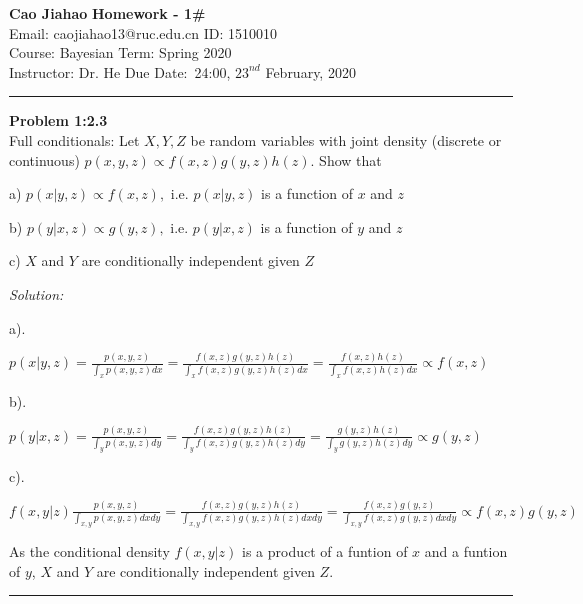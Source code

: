 \documentclass[a4paper, 11pt]{article}
\newenvironment{problem}[2][Problem]
    { \begin{mdframed}[backgroundcolor=gray!20] \textbf{#1 #2} \\}
    {  \end{mdframed}}
\newenvironment{solution}
    {\textit{Solution:}}
    {}
\begin{document}
\noindent
\large\textbf{Cao Jiahao} \hfill \textbf{Homework - 1\#}   \\
Email: caojiahao13@ruc.edu.cn \hfill ID: 1510010 \\
\normalsize Course: Bayesian  \hfill Term: Spring 2020\\
Instructor: Dr. He \hfill Due Date:\ 24:00, $23^{nd}$ February, 2020 \\
\noindent\rule{7in}{2.8pt}

\begin{problem}{1:2.3}
Full conditionals: Let $X, Y, Z$ be random variables with joint density (discrete or continuous) $p(x, y, z) \propto f(x, z) g(y, z) h(z) .$ Show that

a) $p(x | y, z) \propto f(x, z),$ i.e. $p(x | y, z)$ is a function of $x$ and $z$

b) $p(y | x, z) \propto g(y, z),$ i.e. $p(y | x, z)$ is a function of $y$ and $z$

c) $X$ and $Y$ are conditionally independent given $Z$
\end{problem}
\begin{solution}

a).

$p(x|y,z)=\frac{p(x,y,z)}{\int_{x}p(x,y,z)dx}=\frac{f(x, z) g(y, z) h(z)}{\int_{x}f(x, z) g(y, z) h(z)dx}=\frac{f(x, z)  h(z)}{\int_{x}f(x, z) h(z)dx}\propto f(x,z)$

b).

$p(y|x,z)=\frac{p(x,y,z)}{\int_{y}p(x,y,z)dy}=\frac{f(x, z) g(y, z) h(z)}{\int_{y}f(x, z) g(y, z) h(z)dy}=\frac{ g(y, z) h(z)}{\int_{y} g(y, z) h(z)dy}\propto g(y,z)$

c).

$f(x,y|z)\frac{p(x,y,z)}{\int_{x,y}p(x,y,z)dxdy}=\frac{f(x, z) g(y, z) h(z)}{\int_{x,y}f(x, z) g(y, z) h(z)dxdy}=\frac{f(x, z) g(y, z) }{\int_{x,y}f(x, z) g(y, z)dxdy}\propto f(x, z) g(y, z)$

As the conditional density $f(x,y|z)$ is a product of a funtion of $x$ and a funtion of $y$, $X$ and $Y$ are conditionally independent given $Z$.

\end{solution} 
\noindent\rule{7in}{2.8pt}
\end{document}
